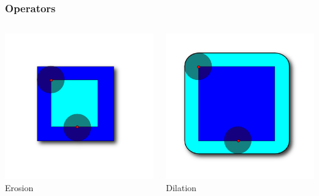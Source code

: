 \begin{frame}[fragile]
\frametitle{Operators}

\begin{columns}[c]

\begin{center}
\includegraphics[width=1\textwidth]{Images/Erosion_shadow} \\
Erosion
\end{center}

\begin{center}
\includegraphics[width=1\textwidth]{Images/Dilation_shadow} \\
Dilation
\end{center}


\end{columns}
\end{frame}

